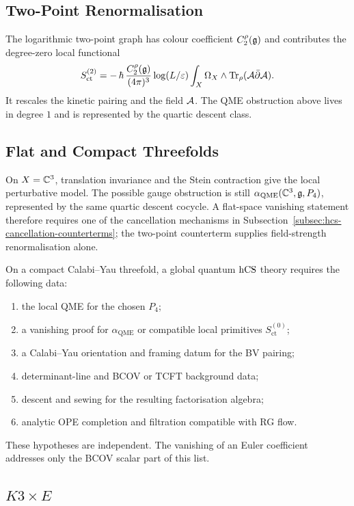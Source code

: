 \subsection{Two-Point Renormalisation}
\label{subsec:hcs-two-point-renormalisation}

The logarithmic two-point graph has colour coefficient \(C_2^\rho(\mathfrak{g})\)
and contributes the degree-zero local functional
\[
  S_{\mathrm{ct}}^{(2)}
  =
  -\,\hbar\,\frac{C_2^\rho(\mathfrak{g})}{(4\pi)^3}
  \log(L/\varepsilon)
  \int_X\Omega_X\wedge\operatorname{Tr}_\rho(\mathcal{A}\bar\partial\mathcal{A}).
\]
It rescales the kinetic pairing and the field \(\mathcal{A}\). The QME
obstruction above lives in degree \(1\) and is represented by the
quartic descent class.

\subsection{Flat and Compact Threefolds}
\label{subsec:hcs-flat-compact-threefolds}

On \(X=\mathbb{C}^3\), translation invariance and the Stein contraction give
the local perturbative model. The possible gauge obstruction is still
\(\alpha_{\mathrm{QME}}(\mathbb{C}^3,\mathfrak{g},P_4)\), represented by the same
quartic descent cocycle. A flat-space vanishing statement therefore
requires one of the cancellation mechanisms in
Subsection~\ref{subsec:hcs-cancellation-counterterms}; the two-point
counterterm supplies field-strength renormalisation alone.

On a compact Calabi--Yau threefold, a global quantum \(\mathrm{hCS}\) theory
requires the following data:
\begin{enumerate}
\item the local QME for the chosen \(P_4\);
\item a vanishing proof for \(\alpha_{\mathrm{QME}}\) or compatible
local primitives \(S_{\mathrm{ct}}^{(0)}\);
\item a Calabi--Yau orientation and framing datum for the BV pairing;
\item determinant-line and BCOV or TCFT background data;
\item descent and sewing for the resulting factorisation algebra;
\item analytic OPE completion and filtration compatible with RG flow.
\end{enumerate}
These hypotheses are independent. The vanishing of an Euler coefficient
addresses only the BCOV scalar part of this list.

\subsection{\texorpdfstring{\(K3\times E\)}{K3 x E}}
\label{subsec:hcs-k3e-separation}

